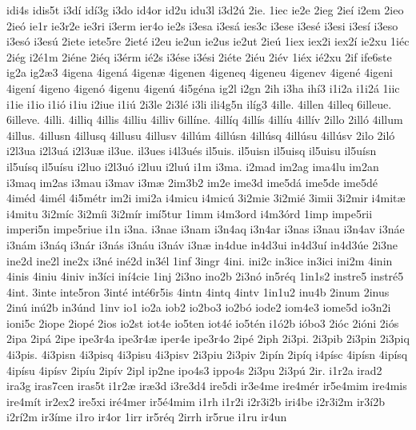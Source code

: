 {idi4s
idis5t
i3d^^ed
id^^ed3g
i3do
id4or
id2u
idu3l
i3d2^^fa
2ie.
1iec
ie2e
2ieg
2ie^^ed
i2em
2ieo
2ie^^f3
ie1r
ie3r2e
ie3ri
i3erm
ier4o
ie2s
i3esa
i3es^^e1
ies3c
i3ese
i3es^^e9
i3esi
i3es^^ed
i3eso
i3es^^f3
i3es^^fa
2iete
iete5re
2iet^^e9
i2eu
ie2un
ie2us
ie2ut
2ie^^fa
1iex
iex2i
iex2^^ed
ie2xu
1i^^e9c
2i^^e9g
i2^^e91m
2i^^e9ne
2i^^e9q
i3^^e9rm
i^^e92s
i3^^e9se
i3^^e9si
2i^^e9te
2i^^e9u
2i^^e9v
1i^^e9x
i^^e92xu
2if
ife6ste
ig2a
ig2^^e63
4igena
4igen^^e1
4igen^^e6
4igenen
4igeneq
4igeneu
4igenev
4igen^^e9
4igeni
4igen^^ed
4igeno
4igen^^f3
4igenu
4igen^^fa
4i5g^^e9na
ig2l
i2gn
2ih
i3ha
ih^^ed3
i1i2a
i1i2^^e1
1iic
i1ie
i1io
i1i^^f3
i1iu
i2iue
i1i^^fa
2i3le
2i3l^^e9
i3li
ili4g5n
il^^edg3
4ille.
4illen
4illeq
6illeue.
6illeve.
4illi.
4illiq
4illis
4illiu
4illiv
6ill^^edne.
4ill^^edq
4ill^^eds
4ill^^edu
4ill^^edv
2illo
2ill^^f3
4illum
4illus.
4illusn
4illusq
4illusu
4illusv
4ill^^fam
4ill^^fasn
4ill^^fasq
4ill^^fasu
4ill^^fasv
2ilo
2il^^f3
i2l3ua
i2l3u^^e1
i2l3u^^e6
il3ue.
il3ues
i4l3u^^e9s
il5uis.
il5uisn
il5uisq
il5uisu
il5u^^edsn
il5u^^edsq
il5u^^edsu
i2luo
i2l3u^^f3
i2luu
i2lu^^fa
i1m
i3ma.
i2mad
im2ag
ima4lu
im2an
i3maq
im2as
i3mau
i3mav
i3m^^e6
2im3b2
im2e
ime3d
ime5d^^e1
ime5de
ime5d^^e9
4im^^e9d
4im^^e9l
4i5m^^e9tr
im2i
imi2a
i4micu
i4mic^^fa
3i2mie
3i2mi^^e9
3imii
3i2mir
i4mit^^e6
i4mitu
3i2m^^edc
3i2m^^edi
3i2m^^edr
im^^ed5tur
1imm
i4m3ord
i4m3^^f3rd
1imp
impe5rii
imperi5n
impe5riue
i1n
i3na.
i3nae
i3nam
i3n4aq
i3n4ar
i3nas
i3nau
i3n4av
i3n^^e1e
i3n^^e1m
i3n^^e1q
i3n^^e1r
i3n^^e1s
i3n^^e1u
i3n^^e1v
i3n^^e6
in4due
in4d3ui
in4d3u^^ed
in4d3^^fae
2i3ne
ine2d
ine2l
ine2x
i3n^^e9
in^^e92d
in3^^e9l
1inf
3ingr
4ini.
ini2c
in3ice
in3ici
ini2m
4inin
4inis
4iniu
4iniv
in3^^edci
in^^ed4cie
1inj
2i3no
ino2b
2i3n^^f3
in5r^^e9q
1in1s2
instre5
instr^^e95
4int.
3inte
inte5ron
3int^^e9
int^^e96r5is
4intn
4intq
4intv
1in1u2
inu4b
2inum
2inus
2in^^fa
in^^fa2b
in3^^fand
1inv
io1
io2a
iob2
io2bo3
io2b^^f3
iode2
iom4e3
iome5d
io3n2i
ioni5c
2iope
2iop^^e9
2ios
io2st
iot4e
io5ten
iot4^^e9
io5t^^e9n
i1^^f32b
i^^f3bo3
2i^^f3c
2i^^f3ni
2i^^f3s
2ipa
2ip^^e1
2ipe
ipe3r4a
ipe3r4^^e6
iper4e
ipe3r4o
2ip^^e9
2iph
2i3pi.
2i3pib
2i3pin
2i3piq
4i3pis.
4i3pisn
4i3pisq
4i3pisu
4i3pisv
2i3piu
2i3piv
2ip^^edn
2ip^^edq
i4p^^edsc
4ip^^edsn
4ip^^edsq
4ip^^edsu
4ip^^edsv
2ip^^edu
2ip^^edv
2ipl
ip2ne
ipo4s3
ippo4s
2i3pu
2i3p^^fa
2ir.
i1r2a
irad2
ira3g
iras7cen
iras5t
i1r2^^e6
ir^^e63d
i3re3d4
ire5di
ir3e4me
ire4m^^e9r
ir5e4mim
ire4mis
ire4m^^edt
ir2ex2
ire5xi
ir^^e94mer
ir5^^e94mim
i1rh
i1r2i
i2r3i2b
iri4be
i2r3i2m
ir3^^ed2b
i2r^^ed2m
ir3^^edme
i1ro
ir4or
1irr
ir5r^^e9q
2irrh
ir5rue
i1ru
ir4un
}
